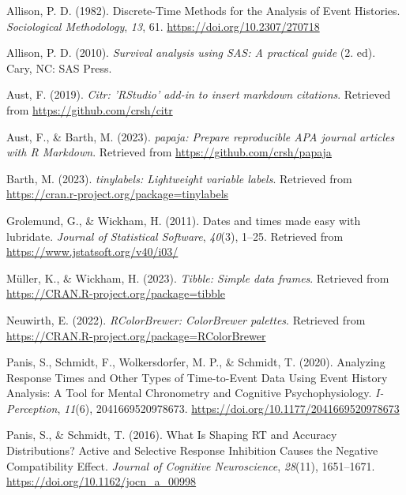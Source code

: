 \documentclass[
  man,floatsintext]{apa6}
\newlength{\cslhangindent}
\newenvironment{CSLReferences}[2] %
 {\begin{list}{}{%
  \setlength{\itemindent}{0pt}
  \setlength{\leftmargin}{0pt}
  \setlength{\parsep}{0pt}
  \ifodd #1
   \setlength{\leftmargin}{\cslhangindent}
   \setlength{\itemindent}{-1\cslhangindent}
  \fi
  \setlength{\itemsep}{#2\baselineskip}}}
 {\end{list}}
\begin{document}
\label{refs}
\begin{CSLReferences}{1}{0}
Allison, P. D. (1982). Discrete-{Time Methods} for the {Analysis} of {Event Histories}. \emph{Sociological Methodology}, \emph{13}, 61. \url{https://doi.org/10.2307/270718}

Allison, P. D. (2010). \emph{Survival analysis using {SAS}: A practical guide} (2. ed). Cary, NC: SAS Press.

Aust, F. (2019). \emph{Citr: 'RStudio' add-in to insert markdown citations}. Retrieved from \url{https://github.com/crsh/citr}

Aust, F., \& Barth, M. (2023). \emph{{papaja}: {Prepare} reproducible {APA} journal articles with {R Markdown}}. Retrieved from \url{https://github.com/crsh/papaja}

Barth, M. (2023). \emph{{tinylabels}: Lightweight variable labels}. Retrieved from \url{https://cran.r-project.org/package=tinylabels}

Grolemund, G., \& Wickham, H. (2011). Dates and times made easy with {lubridate}. \emph{Journal of Statistical Software}, \emph{40}(3), 1--25. Retrieved from \url{https://www.jstatsoft.org/v40/i03/}

Müller, K., \& Wickham, H. (2023). \emph{Tibble: Simple data frames}. Retrieved from \url{https://CRAN.R-project.org/package=tibble}

Neuwirth, E. (2022). \emph{RColorBrewer: ColorBrewer palettes}. Retrieved from \url{https://CRAN.R-project.org/package=RColorBrewer}

Panis, S., Schmidt, F., Wolkersdorfer, M. P., \& Schmidt, T. (2020). Analyzing {Response Times} and {Other Types} of {Time-to-Event Data Using Event History Analysis}: {A Tool} for {Mental Chronometry} and {Cognitive Psychophysiology}. \emph{I-Perception}, \emph{11}(6), 2041669520978673. \url{https://doi.org/10.1177/2041669520978673}

Panis, S., \& Schmidt, T. (2016). What {Is Shaping RT} and {Accuracy Distributions}? {Active} and {Selective Response Inhibition Causes} the {Negative Compatibility Effect}. \emph{Journal of Cognitive Neuroscience}, \emph{28}(11), 1651--1671. \url{https://doi.org/10.1162/jocn_a_00998}


\end{CSLReferences}
\end{document}
